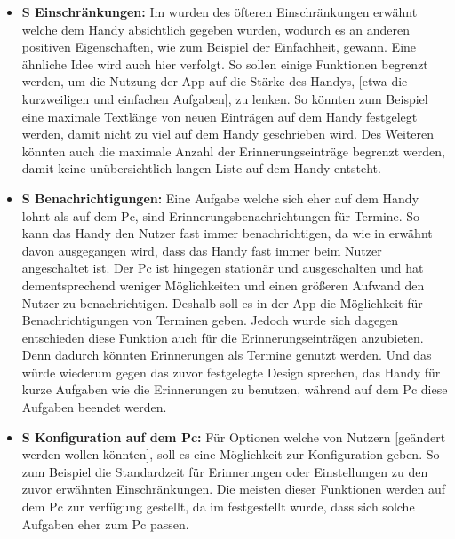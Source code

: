 \begin{itemize}
	\item \textbf{S Einschränkungen:}	%
		Im  wurden des öfteren Einschränkungen erwähnt welche dem Handy absichtlich gegeben wurden, wodurch es an anderen positiven Eigenschaften, wie zum Beispiel der Einfachheit, gewann. %
		Eine ähnliche Idee wird auch hier verfolgt. So sollen einige Funktionen begrenzt werden, um die Nutzung der App auf die Stärke des Handys, [etwa die kurzweiligen und einfachen Aufgaben], zu lenken. %
		So könnten zum Beispiel eine maximale Textlänge von neuen Einträgen auf dem Handy festgelegt werden, damit nicht zu viel auf dem Handy geschrieben wird. Des Weiteren könnten auch die maximale Anzahl der Erinnerungseinträge begrenzt werden, damit keine unübersichtlich langen Liste auf dem Handy entsteht.%


	\item \textbf{S Benachrichtigungen:} %
		Eine Aufgabe welche sich eher auf dem Handy lohnt als auf dem Pc, sind Erinnerungsbenachrichtungen für Termine. 
			So kann das Handy den Nutzer fast immer benachrichtigen, da wie in  erwähnt davon ausgegangen wird, dass das Handy fast immer beim Nutzer angeschaltet ist. Der Pc ist hingegen stationär und ausgeschalten und hat dementsprechend weniger Möglichkeiten und einen größeren Aufwand den Nutzer zu benachrichtigen.\newline%
		Deshalb soll es in der App die Möglichkeit für Benachrichtigungen von Terminen geben.%
		Jedoch wurde sich dagegen entschieden diese Funktion auch für die Erinnerungseinträgen anzubieten. Denn dadurch könnten Erinnerungen als Termine genutzt werden. Und das würde wiederum gegen das zuvor festgelegte Design sprechen, das Handy für kurze Aufgaben wie die Erinnerungen zu benutzen, während auf dem Pc diese Aufgaben beendet werden.%
		
		
	\item \textbf{S Konfiguration auf dem Pc:} %
		Für Optionen welche von Nutzern [geändert werden wollen könnten], soll es eine Möglichkeit zur Konfiguration geben. %
			So zum Beispiel die Standardzeit für Erinnerungen oder Einstellungen zu den zuvor erwähnten Einschränkungen. %
		Die meisten dieser Funktionen werden auf dem Pc zur verfügung gestellt, da im  festgestellt wurde, dass sich solche Aufgaben eher zum Pc passen.%
	

\end{itemize}
